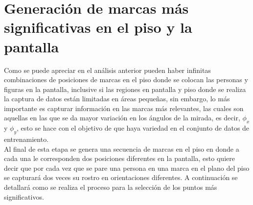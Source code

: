       
	 \section{Generación de marcas más significativas en el piso y la pantalla} \label{secGen}
	 Como se puede apreciar en el análisis anterior pueden haber infinitas combinaciones de posiciones de marcas en el piso donde se colocan las personas y figuras en la pantalla, inclusive si las regiones en pantalla y piso donde se realiza la captura de datos están limitadas en áreas pequeñas, sin embargo, lo más importante es capturar información en las marcas más relevantes, las cuales son aquellas en las que se da mayor variación en los ángulos de la mirada, es decir, $\phi_x$ y $\phi_y$, esto se hace con el objetivo de que haya variedad en el conjunto de datos de entrenamiento.	\\
	  Al final de esta etapa se genera una secuencia de marcas en el piso en donde a cada una le corresponden dos posiciones diferentes en la pantalla, esto quiere decir que por cada vez que se pare una persona en una marca en el plano del piso se capturará dos veces su rostro en orientaciones diferentes. A continuación se detallará como se realiza el proceso para la selección de los puntos más significativos.	 
	  
